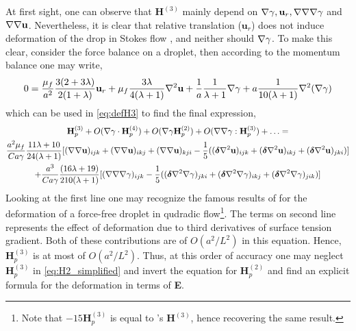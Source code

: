 At first sight, one can observe that $\textbf{H}^{(3)}$ mainly depend on $\mathbf{\nabla}\gamma, \textbf{u}_r, \mathbf{\nabla}\mathbf{\nabla}\mathbf{\nabla}\gamma$ and $\mathbf{\nabla} \mathbf{\nabla} \textbf{u}$. 
Nevertheless, it is clear that relative translation ($\textbf{u}_r$) does not induce deformation of the drop in Stokes flow \citep{nadim1991motion}, and neither should $\mathbf{\nabla}\gamma$. 
To make this clear, consider the  force balance on a droplet, then according to the momentum balance one may write,
\begin{equation}
    0 = 
    \frac{\mu_f}{a^2}
    \frac{3(2+3\lambda)}{2(1+\lambda)}\textbf{u}_r
    + \mu_f  \frac{3\lambda}{4(\lambda +1)} \mathbf{\nabla}^2 \textbf{u}
    +  \frac{1}{a}\frac{1}{\lambda +1} \mathbf{\nabla} \gamma
    +  a \frac{1}{10(\lambda +1)}\mathbf{\nabla}^2(\mathbf{\nabla}\gamma)
\end{equation} 
which can be used in \ref{eq:defH3} to find the final expression, 
\begin{multline}
    \textbf{H}_p^{(3)}
    + O(\mathbf{\nabla}\gamma\cdot \textbf{H}_p^{(4)})
    + O(\mathbf{\nabla}\gamma \textbf{H}_p^{(2)}) 
    + O(\mathbf{\nabla}\mathbf{\nabla}\gamma : \textbf{H}_p^{(3)}) + \ldots
    =\\
    \frac{a^2 \mu_f }{Ca\gamma}\frac{11\lambda+10}{24(\lambda+1)} [
        (\mathbf{\nabla} \mathbf{\nabla} \textbf{u})_{ijk}
        +(\mathbf{\nabla} \mathbf{\nabla} \textbf{u})_{ikj}
        +(\mathbf{\nabla} \mathbf{\nabla} \textbf{u})_{kji}
        - \frac{1}{5}(
            (\bm\delta \mathbf{\nabla}^2 \textbf{u})_{ijk}
            + (\bm\delta \mathbf{\nabla}^2 \textbf{u})_{ikj}
            + (\bm\delta \mathbf{\nabla}^2 \textbf{u})_{jki}
        )
        ]
    \\
    +\frac{a^3 }{Ca\gamma}\frac{(16\lambda +19)}{210(\lambda+1)}[
        (\mathbf{\nabla}\mathbf{\nabla}\mathbf{\nabla}\gamma)_{ijk}
        - \frac{1}{5}
        (
            (\bm\delta \mathbf{\nabla}^2\mathbf{\nabla} \gamma)_{jki}
            + (\bm\delta \mathbf{\nabla}^2\mathbf{\nabla} \gamma)_{ikj}
            + (\bm\delta \mathbf{\nabla}^2\mathbf{\nabla} \gamma)_{jik}
        )
    ]
\end{multline} 
Looking at the first line one may recognize the famous results of \citet{nadim1991motion} for the deformation of a force-free droplet in qudradic flow\footnote{Note that $- 15 \textbf{H}_p^{(3)}$ is equal to \citet{nadim1991motion}'s $\textbf{H}^{(3)}$, hence recovering the same result.  }.  
The terms on second line represents the effect of deformation due to third derivatives of surface tension gradient. 
Both of these contributions are of $O(a^2/L^2)$ in this equation. 
Hence, $\textbf{H}_p^{(3)}$ is at most of $O(a^2/L^2)$. 
Thus, at this order of accuracy one may neglect $\textbf{H}_p^{(3)}$ in \ref{eq:H2_simplified} and invert the equation for $\textbf{H}_p^{(2)}$ and find an explicit formula for the deformation in terms of \textbf{E}. 

